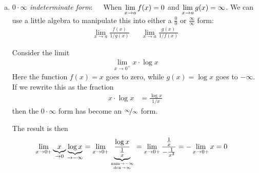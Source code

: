 \begin{enumerate}[(a)]
\item $0\cdot\infty$ \emph{indeterminate form}:\ \ \ When $\displaystyle \lim_{x\to a}f(x) = 0$ and
$\displaystyle \lim_{x\to a} g(x) = \infty$. We can use a little algebra to manipulate this into
either a $\frac{0}{0}$ or $\frac{\infty}{\infty}$ form:
\begin{align*}
  \lim_{x \to a} \frac{f(x)}{1/g(x)} &&
  \lim_{x \to a} \frac{g(x)}{1/f(x)}
\end{align*}
\begin{eg}\label{eg:hopitalJ}
Consider the limit
\begin{align*}
  \lim_{x\to 0^+} x \cdot \log x
\end{align*}
Here the function $f(x)=x$ goes to zero, while $g(x)=\log x$ goes to $-\infty$. If we
rewrite this as the fraction
\begin{align*}
  x \cdot \log x &= \frac{\log x}{1/x}
\end{align*}
then the $0 \cdot \infty$ form has become an $\nicefrac\infty\infty$ form.

The result is then
\begin{align*}
\lim_{x\rightarrow 0+}\underbrace{x}_{\rightarrow 0}
                      \underbrace{\log x}_{\rightarrow-\infty}
& =\lim_{x\rightarrow 0+}\underbrace{\frac{\log x}
     {\frac{1}{x}}}_{\atp
        {\mathrm{num}\rightarrow-\infty}
        {\mathrm{den}\rightarrow\infty}}
=\lim_{x\rightarrow 0+}\frac{\frac{1}{x}}{-\frac{1}{x^2}}
=-\lim_{x\rightarrow 0+}x
=0
\end{align*}
\end{eg}



\end{enumerate}
